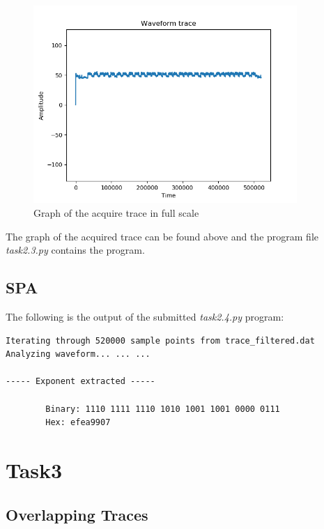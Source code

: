 \documentclass[1p,16pt]{elsarticle}
\begin{document}
\begin{figure}[H]
	\centering
    \centerline{\includegraphics[width=10cm]{trace_plot}}
    \caption{Graph of the acquire trace in full scale}\label{fig:acquired_trace}
\end{figure}

The graph of the acquired trace can be found above and
the program file \textit{task2.3.py} contains the program.

\subsection{SPA}%
\label{sub:spa}

The following is the output of the submitted \textit{task2.4.py} program:
\begin{verbatim}
Iterating through 520000 sample points from trace_filtered.dat
Analyzing waveform... ... ...

----- Exponent extracted -----

        Binary: 1110 1111 1110 1010 1001 1001 0000 0111
		Hex: efea9907
\end{verbatim}

\section{Task3}

\subsection{Overlapping Traces}%
\label{sub:overlapping_traces}
\end{document}
